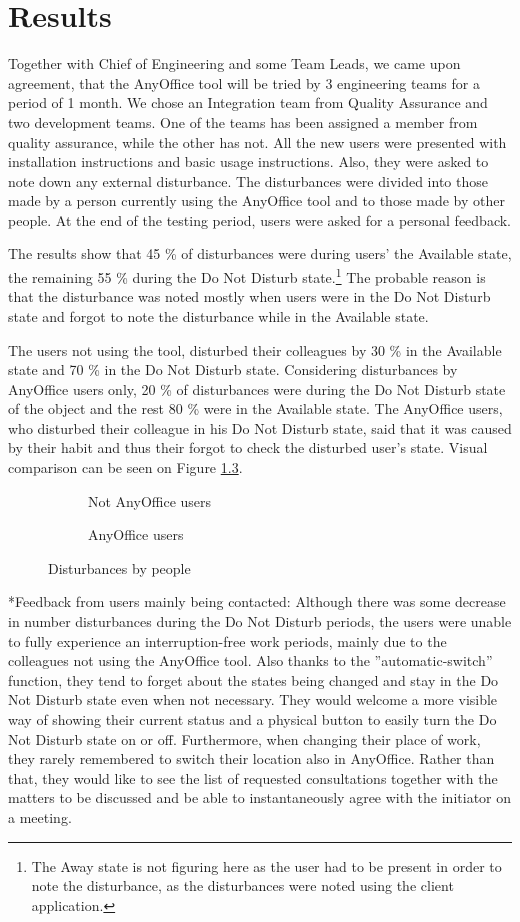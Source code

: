 \documentclass[11pt,singleside]{myfithesis2}
\makeatletter
\newcommand{\twopict}[9]{
	\begin{figure}[h!]
  		\vspace{-7px}
		\begin{subfigure}{.5\textwidth}
  			\centerline{\fcolorbox{darkgray}{palegray}{\texttt{[image: \#2]}}}
  			\caption{#1}
  			\label{#3}
		\end{subfigure}
		\begin{subfigure}{.5\textwidth}
  			\centerline{\fcolorbox{darkgray}{palegray}{\texttt{[image: \#5]}}}
  			\caption{#4}
  			\label{#6}
		\end{subfigure}
		\caption{#7}
		\label{#9}
	\end{figure}
}
\renewcommand\paragraph{
   \vspace{-10pt}
   \@startsection{paragraph}{4}{0mm}
      {\baselineskip}
      {- 5pt}
      {\normalfont\normalsize\bfseries}
}
\makeatother
\begin{document}
\chapter{Results}\label{results}
Together with Chief of Engineering and some Team Leads, we came upon agreement, that the AnyOffice tool will be tried by 3 engineering teams for a period of 1 month. We chose an Integration team from Quality Assurance and two development teams. One of the teams has been assigned a member from quality assurance, while the other has not. All the new users were presented with installation instructions and basic usage instructions. Also, they were asked to note down any external disturbance. The disturbances were divided into those made by a person currently using the AnyOffice tool and to those made by other people. At the end of the testing period, users were asked for a personal feedback.

The results show that 45 \% of disturbances were during users' the Available state, the remaining 55 \% during the Do Not Disturb state.\footnote{The Away state is not figuring here as the user had to be present in order to note the disturbance, as the disturbances were noted using the client application.} The probable reason is that the disturbance was noted mostly when users were in the Do Not Disturb state and forgot to note the disturbance while in the Available state.

The users not using the tool, disturbed their colleagues by 30 \% in the Available state and 70 \% in the Do Not Disturb state. Considering disturbances by AnyOffice users only, 20 \% of disturbances were during the Do Not Disturb state of the object and the rest 80 \% were in the Available state. The AnyOffice users, who disturbed their colleague in his Do Not Disturb state, said that it was caused by their habit and thus their forgot to check the disturbed user's state. Visual comparison can be seen on Figure \ref{pic:disturbancesGraphs}.

\twopict{Not AnyOffice users}{data/aoNotDisturbances.png}{pic:aoNotDisturbances}{AnyOffice users}{data/aoDisturbances.png}{pic:aoDisturbances}{Disturbances by people}{width=0.9\textwidth}{pic:disturbancesGraphs}

\paragraph*{Feedback from users mainly being contacted: } Although there was some decrease in number disturbances during the Do Not Disturb periods, the users were unable to fully experience an interruption-free work periods, mainly due to the colleagues not using the AnyOffice tool. Also thanks to the ''automatic-switch'' function, they tend to forget about the states being changed and stay in the Do Not Disturb state even when not necessary. They would welcome a more visible way of showing their current status and a physical button to easily turn the Do Not Disturb state on or off. Furthermore, when changing their place of work, they rarely remembered to switch their location also in AnyOffice. Rather than that, they would like to see the list of requested consultations together with the matters to be discussed and be able to instantaneously agree with the initiator on a meeting.
\end{document}
